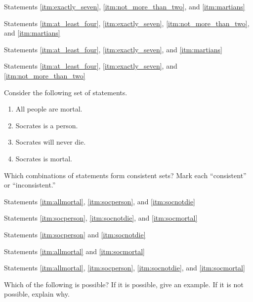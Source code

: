 \begin{exercises}
\item Statements \ref{itm:exactly_seven}, \ref{itm:not_more_than_two}, and \ref{itm:martians} 
\item Statements \ref{itm:at_least_four}, \ref{itm:exactly_seven}, \ref{itm:not_more_than_two}, and \ref{itm:martians} 
\item Statements \ref{itm:at_least_four}, \ref{itm:exactly_seven}, and \ref{itm:martians}
\item Statements \ref{itm:at_least_four}, \ref{itm:exactly_seven}, and \ref{itm:not_more_than_two} 
\end{exercises}

\noindent \problempart Consider the following set of statements.
\begin{enumerate}[label=(\alph*)]
\item \label{itm:allmortal} All people are mortal.
\item \label{itm:socperson} Socrates is a person.
\item \label{itm:socnotdie} Socrates will never die.
\item \label{itm:socmortal} Socrates is mortal.
\end{enumerate}
Which combinations of statements form consistent sets? Mark each “consistent” or “inconsistent.”
\begin{exercises}
\item Statements \ref{itm:allmortal}, \ref{itm:socperson}, and \ref{itm:socnotdie}  
\item Statements \ref{itm:socperson}, \ref{itm:socnotdie}, and \ref{itm:socmortal} 
\item Statements \ref{itm:socperson} and \ref{itm:socnotdie} 
\item Statements \ref{itm:allmortal} and \ref{itm:socmortal} 
\item Statements \ref{itm:allmortal}, \ref{itm:socperson}, \ref{itm:socnotdie}, and \ref{itm:socmortal} 
\end{exercises}

\noindent \problempart \label{pr.EnglishCombinations} Which of the following is possible? If it is possible, give an example. If it is not possible, explain why.


